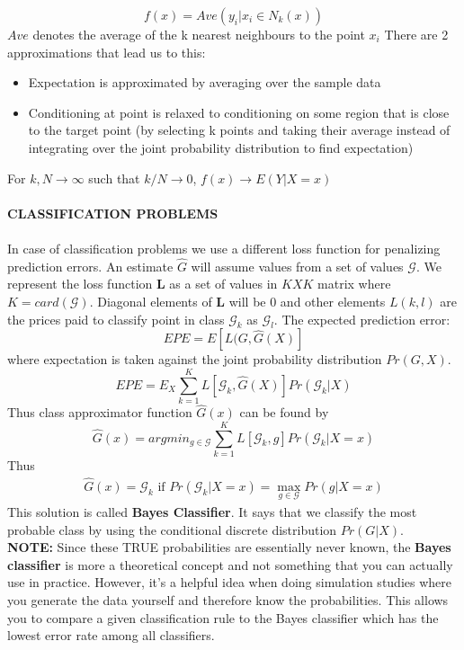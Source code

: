 \documentclass[12pt]{article}
\begin{document}
\begin{equation}
    f(x) = Ave( y_i | x_i \in N_k(x))
\end{equation}
$Ave$ denotes the average of the k nearest neighbours to the point $x_{i}$ 
There are 2 approximations that lead us to this: 
\begin{itemize}
    \item Expectation is approximated by averaging over the sample data 
    \item Conditioning at point is relaxed to conditioning on some region that is close to the target point (by selecting k points and taking their average instead of integrating over the joint probability distribution to find expectation)  
\end{itemize}

For $k, N \xrightarrow{} \infty$ such that $k/N \xrightarrow{} 0$, $f(x) \xrightarrow{} E(Y|X=x)$
\\ \\
\textbf{CLASSIFICATION PROBLEMS}
\\ \\
In case of classification problems we use a different loss function for penalizing prediction errors. An estimate $\hat{G}$ will assume values from a set of values $\mathcal{G}$. We represent the loss function $\textbf{L}$ as a set of values in $K X K$ matrix where $K = card(\mathcal{G})$. Diagonal elements of $\textbf{L}$ will be 0 and other elements $L(k,l)$ are the prices paid to classify point in class $\mathcal{G}_k$ as $\mathcal{G}_l$. The expected prediction error: 
\begin{equation}
    EPE = E[L(G,\hat{G}(X)]    
\end{equation}
where expectation is taken against the joint probability distribution $Pr(G,X)$. 
\begin{equation}
    EPE = E_X \sum_{k=1}^{K} L[\mathcal{G}_{k}, \hat{G}(X)] Pr(\mathcal{G}_k | X)
\end{equation}
Thus class approximator function $\hat{G}(x)$ can be found by 
\begin{equation}
    \hat{G}(x) = argmin_{g \in \mathcal{G}}\sum_{k=1}^{K} L[\mathcal{G}_{k}, g] Pr(\mathcal{G}_k | X = x)
\end{equation}
Thus 
\begin{align}
    \hat{G}(x) = \mathcal{G}_k \mbox{ if } Pr(\mathcal{G}_k | X = x) = \max_{g \in \mathcal{G}} Pr(g | X = x)
\end{align}
This solution is called \textbf{Bayes Classifier}. It says that we classify the most probable class by using the conditional discrete distribution $Pr(G|X)$. \\ \textbf{NOTE:} Since these TRUE probabilities are essentially never known, the \textbf{Bayes classifier} is more a theoretical concept and not something that you can actually use in practice. However, it's a helpful idea when doing simulation studies where you generate the data yourself and therefore know the probabilities. This allows you to compare a given classification rule to the Bayes classifier which has the lowest error rate among all classifiers.
\end{document}
